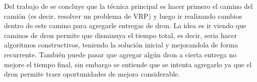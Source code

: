 Del trabajo de \cite{moshrefjavadi2021applications} se concluye que la técnica principal es hacer primero el camino del camión (es decir, resolver un problema de VRP) y luego ir realizando cambios dentro de este camino para agregarle entregas de dron. La idea es ir viendo que caminos de dron permite que disminuya el tiempo total, es decir, seria hacer algoritmos constructivos, teniendo la solución inicial y mejorandola de forma recurrente. También puede pasar que agregar algún dron a cierta entrega no mejore el tiempo final, sin embargo se entiende que se intenta agregarlo ya que el dron permite traer oportunidades de mejora considerable.
